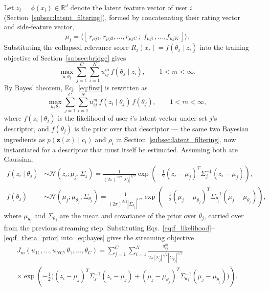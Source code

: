 \documentclass{article}
\begin{document}
Let $z_i = \phi(x_i) \in \mathbb{R}^d$ denote the latent feature vector of user $i$ (Section~\ref{subsec:latent_filtering}), formed by concatenating their rating vector and side-feature vector,
\[
\mu_j = \big\langle [\,r_{\mu j1}, r_{\mu j2}, \ldots, r_{\mu jC}\,;\; f_{\mu j1}, \ldots, f_{\mu jK}\,] \big\rangle .
\]
Substituting the collapsed relevance score $R_j(x_i) = f(\theta_j \mid z_i)$ into the training objective of Section~\ref{subsec:bridge} gives
\begin{equation}
	\label{eq:first}
	\max_{u,\theta_j} \sum_{j=1}^{C} \sum_{i=1}^{N} u_{ij}^m \, f(\theta_j \mid z_i), \qquad 1 < m < \infty.
\end{equation}
By Bayes' theorem, Eq.~\eqref{eq:first} is rewritten as
\begin{equation}
	\label{eq:bayes}
	\max_{u,\theta_j} \sum_{j=1}^{C} \sum_{i=1}^{N} u_{ij}^m \, f(z_i \mid \theta_j) \, f(\theta_j), \qquad 1 < m < \infty,
\end{equation}
where $f(z_i \mid \theta_j)$ is the likelihood of user $i$'s latent vector under set $j$'s descriptor, and $f(\theta_j)$ is the prior over that descriptor — the same two Bayesian ingredients as $p(\mathbf{z}(x)\mid c_i)$ and $\rho_i$ in Section~\ref{subsec:latent_filtering}, now instantiated for a descriptor that must itself be estimated. Assuming both are Gaussian,
\begin{align}
	f(z_i \mid \theta_j) &\sim \mathcal{N}(z_i; \mu_j, \Sigma_j) = \frac{1}{(2\pi)^{d/2} |\Sigma_j|^{1/2}} \exp\!\left( -\frac{1}{2} (z_i - \mu_j)^T \Sigma_j^{-1} (z_i - \mu_j) \right), \label{eq:f_likelihood} \\
	f(\theta_j) &\sim \mathcal{N}(\mu_j; \mu_{\theta_j}, \Sigma_{\theta_j}) = \frac{1}{(2\pi)^{d/2} |\Sigma_{\theta_j}|^{1/2}} \exp\!\left( -\frac{1}{2} (\mu_j - \mu_{\theta_j})^T \Sigma_{\theta_j}^{-1} (\mu_j - \mu_{\theta_j}) \right), \label{eq:f_theta_prior}
\end{align}
where $\mu_{\theta_j}$ and $\Sigma_{\theta_j}$ are the mean and covariance of the prior over $\theta_j$, carried over from the previous streaming step. Substituting Eqs.~\eqref{eq:f_likelihood}--\eqref{eq:f_theta_prior} into~\eqref{eq:bayes} gives the streaming objective
\begin{equation}
	\label{eq:obj_function}
	\begin{split}
		J_m(u_{11}, \ldots, u_{NC}, \theta_1, \ldots, \theta_C) = \sum_{j=1}^{C} \sum_{i=1}^{N} \frac{u_{ij}^m}{2\pi \, |\Sigma_j|^{1/2} |\Sigma_{\theta_j}|^{1/2}} \\
		\times \exp\!\left( -\frac{1}{2} \Big( (z_i - \mu_j)^T \Sigma_j^{-1} (z_i - \mu_j) + (\mu_j - \mu_{\theta_j})^T \Sigma_{\theta_j}^{-1} (\mu_j - \mu_{\theta_j}) \Big) \right).
	\end{split}
\end{equation}
\end{document}

